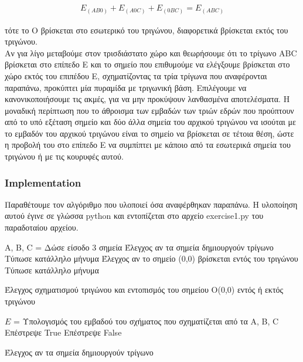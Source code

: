 \documentclass[12pt]{article}
\begin{document}
\begin{align*}
E_{(AB0)} + E_{(A0C)} + E_{(0BC)} = E_{(ABC)}
\end{align*}

τότε το O βρίσκεται στο εσωτερικό του τριγώνου, διαφορετικά βρίσκεται εκτός του τριγώνου. \\

Αν για λίγο μεταβούμε στον τρισδιάστατο χώρο και θεωρήσουμε ότι το τρίγωνο ABC βρίσκεται στο επίπεδο E και το σημείο που επιθυμούμε να ελέγξουμε βρίσκεται στο χώρο εκτός του επιπέδου Ε, σχηματίζοντας τα τρία τρίγωνα που αναφέρονται παραπάνω, προκύπτει μία πυραμίδα με τριγωνική βάση. Επιλέγουμε να κανονικοποιήσουμε τις ακμές, για να μην προκύψουν λανθασμένα αποτελέσματα. Η μοναδική περίπτωση που το άθροισμα των εμβαδών των τριών εδρών που προύπτουν από το υπό εξέταση σημείο και δύο άλλα σημεία του αρχικού τριγώνου να ισούται με το εμβαδόν του αρχικού τριγώνου είναι το σημείο να βρίσκεται σε τέτοια θέση, ώστε η προβολή του στο επίπεδο E να συμπίπτει με κάποιο από τα εσωτερικά σημεία του τριγώνου ή με τις κουρυφές αυτού. \\

\subsubsection*{Implementation}

Παραθέτουμε τον αλγόριθμο που υλοποιεί όσα αναφέρθηκαν παραπάνω. Η υλοποίηση αυτού έγινε σε γλώσσα python και εντοπίζεται στο αρχείο exercise1.py του παραδοταίου αρχείου.

\begin{algorithm}[H]
	\SetAlgoLined

	A, B, C = Δώσε είσοδο 3 σημεία \;
	Έλεγχος αν τα σημεία δημιουργούν τρίγωνο \;
	{Τύπωσε κατάλληλο μήνυμα \;
	Έλεγχος αν το σημείο (0,0) βρίσκεται εντός του τριγώνου \;}
	{Τύπωσε κατάλληλο μήνυμα \;}

	\caption{Έλεγχος σχηματισμού τριγώνου και εντοπισμός του σημείου O(0,0) εντός ή εκτός τριγώνου}
\end{algorithm}

\begin{algorithm}[H]
	\SetAlgoLined

	\(Ε\) = Υπολογισμός του εμβαδού του σχήματος που σχηματίζεται από τα A, B, C \;
	{Επέστρεψε True \;}
	{Επέστρεψε False \;}

	\caption{Έλεγχος αν τα σημεία δημιουργούν τρίγωνο}
\end{algorithm}
\end{document}
